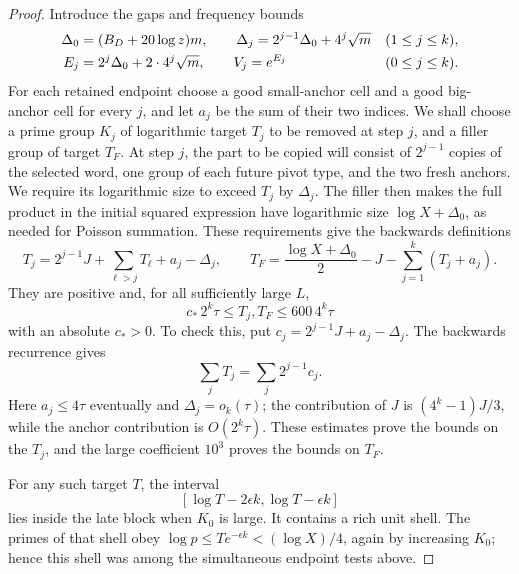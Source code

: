 \begin{proof}
Introduce the gaps and frequency bounds
\begin{align}
 \Delta_0&=(B_D+20\log z)m,\qquad
 \Delta_j=2^{j-1}\Delta_0+4^j\sqrt m
       &&(1\le j\le k),\notag\\
 E_j&=2^j\Delta_0+2\cdot4^j\sqrt m,\qquad
 V_j=e^{E_j}
       &&(0\le j\le k).
 \label{eq:src17}
\end{align}
For each retained endpoint choose a good small-anchor cell and a
good big-anchor cell for every \(j\), and let \(a_j\) be the sum
of their two indices. We shall choose a prime group \(K_j\) of
logarithmic target \(T_j\) to be removed at step \(j\), and a
filler group of target \(T_F\). At step \(j\), the part to be
copied will consist of \(2^{j-1}\) copies of the selected word,
one group of each future pivot type, and the two fresh anchors.
We require its logarithmic size to exceed \(T_j\) by \(\Delta_j\).
The filler then makes the full product in the initial squared
expression have logarithmic size \(\log X+\Delta_0\), as needed
for Poisson summation. These requirements give the backwards definitions
\[
 T_j=2^{j-1}J+\sum_{\ell>j}T_\ell+a_j-\Delta_j,
 \qquad
 T_F=\frac{\log X+\Delta_0}{2}
       -J-\sum_{j=1}^k(T_j+a_j).
\]
They are positive and, for all sufficiently large \(L\),
\[
 c_*\,2^k\tau\le T_j,T_F\le600\,4^k\tau
\]
with an absolute \(c_*>0\). To check this, put
\(c_j=2^{j-1}J+a_j-\Delta_j\). The backwards recurrence gives
\[
 \sum_jT_j=\sum_j2^{j-1}c_j.
\]
Here \(a_j\le4\tau\) eventually and \(\Delta_j=o_k(\tau)\);
the contribution of \(J\) is
\((4^k-1)J/3\), while the anchor contribution is \(O(2^k\tau)\).
These estimates prove the bounds on the \(T_j\), and the large
coefficient \(10^3\) proves the bounds on \(T_F\).

For any such target \(T\), the interval
\[
 [\log T-2\epsilon k,\log T-\epsilon k]
\]
lies inside the late block when \(K_0\) is large. It contains a
rich unit shell. The primes of that shell obey
\(\log p\le T e^{-\epsilon k}<(\log X)/4\), again by increasing
\(K_0\); hence this shell was among the simultaneous endpoint
tests above.


\end{proof}
